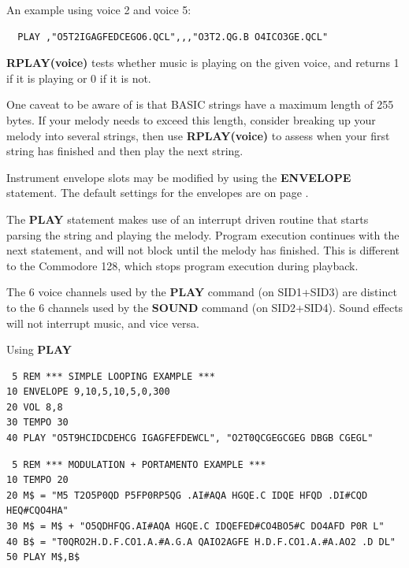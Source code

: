 \begin{description}[leftmargin=2cm,style=nextline]
  An example using voice 2 and voice 5:

\begin{tcolorbox}[colback=black,coltext=white]
\verbatimfont{\codefont}
\begin{verbatim}
  PLAY ,"O5T2IGAGFEDCEGO6.QCL",,,"O3T2.QG.B O4ICO3GE.QCL"
\end{verbatim}
\end{tcolorbox}

  {\bf RPLAY(voice)} tests whether music is playing on the given voice, and
  returns 1 if it is playing or 0 if it is not.

  One caveat to be aware of is that BASIC strings have a maximum length of 255 bytes.
  If your melody needs to exceed this length, consider breaking up your melody into several
  strings, then use {\bf RPLAY(voice)} to assess when your first string has finished and then
  play the next string.

  Instrument envelope slots may be modified by using the {\bf ENVELOPE}
  statement. The default settings for the envelopes are on
  page \pageref{envelopetable}.

\item [Remarks:] The {\bf PLAY} statement makes use of an interrupt driven
                 routine that starts parsing the string and playing the
                 melody. Program execution continues with the next statement,
                 and will not block until the melody has finished. This is
                 different to the Commodore 128, which stops program
                 execution during playback.

                 The 6 voice channels used by the {\bf PLAY} command (on
                 SID1+SID3) are distinct to the 6 channels used by the {\bf
                 SOUND} command (on SID2+SID4). Sound effects will not
                 interrupt music, and vice versa.

\item [Example:] Using {\bf PLAY}
\begin{tcolorbox}[colback=black,coltext=white]
\verbatimfont{\codefont}
\begin{verbatim}
 5 REM *** SIMPLE LOOPING EXAMPLE ***
10 ENVELOPE 9,10,5,10,5,0,300
20 VOL 8,8
30 TEMPO 30
40 PLAY "O5T9HCIDCDEHCG IGAGFEFDEWCL", "O2T0QCGEGCGEG DBGB CGEGL"
\end{verbatim}
\end{tcolorbox}

\begin{tcolorbox}[colback=black,coltext=white]
\verbatimfont{\codefont}
\begin{verbatim}
 5 REM *** MODULATION + PORTAMENTO EXAMPLE ***
10 TEMPO 20
20 M$ = "M5 T2O5P0QD P5FP0RP5QG .AI#AQA HGQE.C IDQE HFQD .DI#CQD HEQ#CQO4HA"
30 M$ = M$ + "O5QDHFQG.AI#AQA HGQE.C IDQEFED#CO4BO5#C DO4AFD P0R L"
40 B$ = "T0QRO2H.D.F.CO1.A.#A.G.A QAIO2AGFE H.D.F.CO1.A.#A.AO2 .D DL"
50 PLAY M$,B$
\end{verbatim}
\end{tcolorbox}
\end{description}


